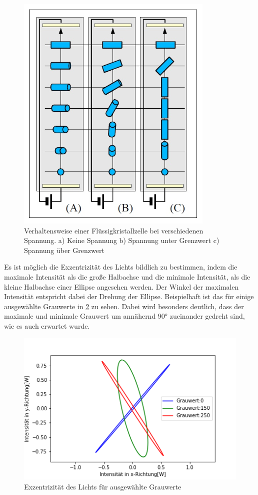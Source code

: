  
\begin{figure}[h!]
	\centering
	\includegraphics[scale=0.6]{LC-Zelle.png}
	\caption{Verhaltensweise einer Flüssigkristallzelle bei verschiedenen Spannung. a) Keine Spannung b) Spannung unter Grenzwert c) Spannung über Grenzwert}
	\label{LC-Modul}
\end{figure}


Es ist möglich die Exzentrizität des Lichts bildlich zu bestimmen, indem die maximale Intensität als die große Halbachse und die minimale Intensität, als die kleine Halbachse einer Ellipse angesehen werden. Der Winkel der maximalen Intensität entspricht dabei der Drehung der Ellipse. Beispielhaft ist das für einige ausgewählte Grauwerte in \cref{Ellipse} zu sehen. Dabei wird besonders deutlich, dass der maximale und minimale Grauwert um annähernd 90° zueinander gedreht sind, wie es auch erwartet wurde.

\begin{figure}[h!]
	\centering
	\includegraphics[scale=0.6]{Ellipse.png}
	\caption{Exzentrizität des Lichts für ausgewählte Grauwerte}
	\label{Ellipse}
\end{figure}





